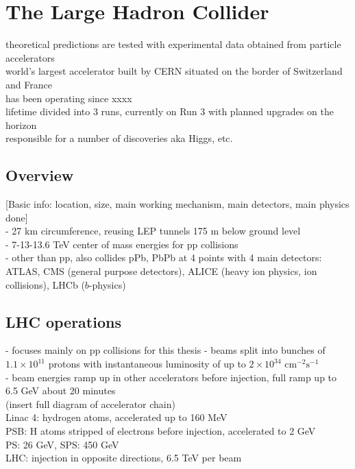 \documentclass[../thesis.tex]{subfiles}
\begin{document}
\vspace{-1\baselineskip}

\section{The Large Hadron Collider}
\label{sec:LHC}
theoretical predictions are tested with experimental data obtained from particle accelerators\\
world's largest accelerator built by CERN situated on the border of Switzerland and France\\
has been operating since xxxx\\
lifetime divided into 3 runs, currently on Run 3 with planned upgrades on the horizon\\
responsible for a number of discoveries aka Higgs, etc.

\subsection{Overview}
[Basic info: location, size, main working mechanism, main detectors, main physics done]\\
- 27 km circumference, reusing LEP tunnels 175 m below ground level\\
- 7-13-13.6 TeV center of mass energies for pp collisions\\
- other than pp, also collides pPb, PbPb at 4 points with 4 main detectors: ATLAS, CMS (general purpose detectors), ALICE (heavy ion physics, ion collisions), LHCb ($b$-physics)

\subsection{LHC operations}
- focuses mainly on pp collisions for this thesis
- beams split into bunches of $1.1\times 10^{11}$ protons with instantaneous luminosity of up to $2\times 10^{34} \text{ cm}^{-2}\text{s}^{-1}$\\
- beam energies ramp up in other accelerators before injection, full ramp up to 6.5 GeV about 20 minutes\\
(insert full diagram of accelerator chain)\\
Linac 4: hydrogen atoms, accelerated up to 160 MeV\\
PSB: H atoms stripped of electrons before injection, accelerated to 2 GeV\\
PS: 26 GeV, SPS: 450 GeV\\
LHC: injection in opposite directions, 6.5 TeV per beam\\
\end{document}
